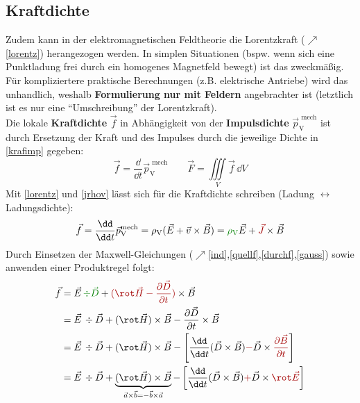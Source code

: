 \subsection{Kraftdichte}
  Zudem kann in der elektromagnetischen Feldtheorie die Lorentzkraft ($\nearrow$\ref{lorentz}) herangezogen werden. In simplen Situationen (bspw. wenn sich eine Punktladung frei durch ein homogenes Magnetfeld bewegt) ist das zweckmäßig. Für kompliziertere praktische Berechnungen (z.B. elektrische Antriebe) wird das unhandlich, weshalb \textbf{Formulierung nur mit Feldern} angebrachter ist (letztlich ist es nur eine \enquote{Umschreibung} der Lorentzkraft).\\
 Die lokale \textbf{Kraftdichte} \(\vec{f}\) in Abhängigkeit von der \textbf{Impulsdichte} \(\vec{p}_\text{V}^\text{ mech}\) ist durch Ersetzung der Kraft und des Impulses durch die jeweilige Dichte in \ref{krafimp} gegeben:
		        \begin{equation}
			        \vec{f}= \frac{\dd}{\dd t} \vec{p}_\text{V}^\text{ mech} \quad \quad \vec{F} =\iiint\limits_V \vec{f}\, \dd V
		        \end{equation}
Mit \ref{lorentz} und \ref{jrhov} lässt sich für die Kraftdichte schreiben (Ladung $\leftrightarrow$ Ladungsdichte):
		        \begin{equation}\label{kraftdicht}
			        \vec{f}= \frac{\dd}{\dd t}\vec{p}_\text{V}^\text{mech} =\rho_\text{V} (\vec{E} + \vec{v} \times \vec{B} ) = \textcolor{green}{\rho_\text{V}} \vec{E} + \textcolor{red}{\vec{J}} \times \vec{B}
		        \end{equation}
		   Durch Einsetzen der Maxwell-Gleichungen ($\nearrow$\ref{ind},\ref{quellf},\ref{durchf},\ref{gauss}) sowie anwenden einer Produktregel folgt:
		        \begin{align}
			        \vec{f} & =  \vec{E}\, \textcolor{green}{\div \vec{D} } + \textcolor{red}{(\rot \vec{H} -\frac{\partial \vec{D} }{\partial t})} \times \vec{B}   \nonumber                                                                                                                \\
			                & = \vec{E}\, \div \vec{D}  + (\rot \vec{H} ) \times \vec{B}  - \frac{\partial \vec{D} }{\partial t}  \times \vec{B}   \nonumber                                                                                                                                  \\
			                & = \vec{E}\, \div \vec{D}  + (\rot \vec{H} ) \times \vec{B}  - \left[ \frac{\dd }{\dd t}(\vec{D}  \times \vec{B} ) \textcolor{red}{-} \vec{D}  \times \textcolor{red}{\frac{\partial \vec{B} }{\partial t}} \right]  \nonumber                             \\
			                & = \vec{E}\, \div \vec{D}  + \underbrace{(\rot \vec{H} ) \times \vec{B}}_{\vec{a}\times\vec{b}=-\vec{b}\times\vec{a}}  - \left[ \frac{\dd }{\dd t}(\vec{D}  \times \vec{B} ) \textcolor{red}{+} \vec{D}  \times \textcolor{red}{\rot \vec{E}}\nonumber \right]      \end{align}
